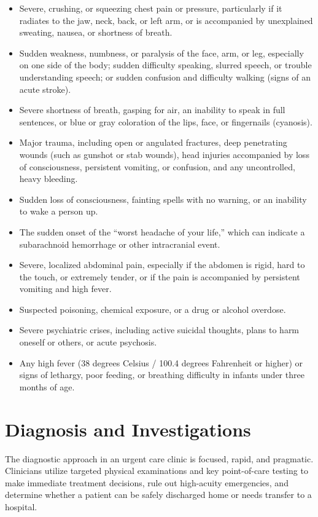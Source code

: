 \begin{itemize}
  \item Severe, crushing, or squeezing chest pain or pressure, particularly if it radiates to the jaw, neck, back, or left arm, or is accompanied by unexplained sweating, nausea, or shortness of breath.
  \item Sudden weakness, numbness, or paralysis of the face, arm, or leg, especially on one side of the body; sudden difficulty speaking, slurred speech, or trouble understanding speech; or sudden confusion and difficulty walking (signs of an acute stroke).
  \item Severe shortness of breath, gasping for air, an inability to speak in full sentences, or blue or gray coloration of the lips, face, or fingernails (cyanosis).
  \item Major trauma, including open or angulated fractures, deep penetrating wounds (such as gunshot or stab wounds), head injuries accompanied by loss of consciousness, persistent vomiting, or confusion, and any uncontrolled, heavy bleeding.
  \item Sudden loss of consciousness, fainting spells with no warning, or an inability to wake a person up.
  \item The sudden onset of the ``worst headache of your life,'' which can indicate a subarachnoid hemorrhage or other intracranial event.
  \item Severe, localized abdominal pain, especially if the abdomen is rigid, hard to the touch, or extremely tender, or if the pain is accompanied by persistent vomiting and high fever.
  \item Suspected poisoning, chemical exposure, or a drug or alcohol overdose.
  \item Severe psychiatric crises, including active suicidal thoughts, plans to harm oneself or others, or acute psychosis.
  \item Any high fever (38 degrees Celsius / 100.4 degrees Fahrenheit or higher) or signs of lethargy, poor feeding, or breathing difficulty in infants under three months of age.
\end{itemize}

\section*{Diagnosis and Investigations}
The diagnostic approach in an urgent care clinic is focused, rapid, and pragmatic. Clinicians utilize targeted physical examinations and key point-of-care testing to make immediate treatment decisions, rule out high-acuity emergencies, and determine whether a patient can be safely discharged home or needs transfer to a hospital.

